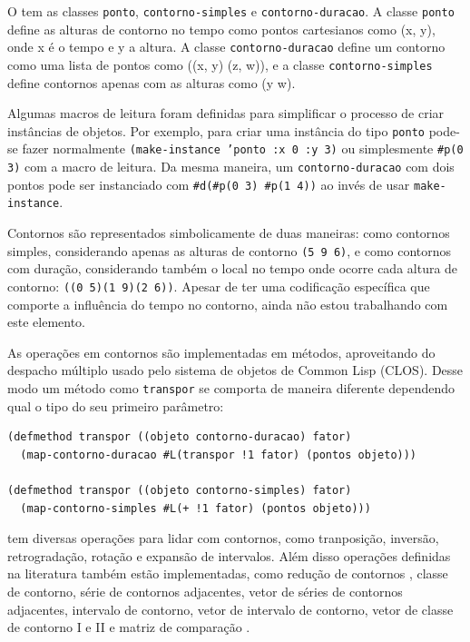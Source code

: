 O \goiaba{} tem as classes \texttt{ponto}, \texttt{contorno-simples} e
\texttt{contorno-duracao}. A classe \texttt{ponto} define as alturas
de contorno no tempo como pontos cartesianos como (x, y), onde x é o
tempo e y a altura. A classe \texttt{contorno-duracao} define um
contorno como uma lista de pontos como ((x, y) (z, w)), e a classe
\texttt{contorno-simples} define contornos apenas com as alturas como
(y w).

Algumas macros de leitura foram definidas para simplificar o processo
de criar instâncias de objetos. Por exemplo, para criar uma instância
do tipo \texttt{ponto} pode-se fazer normalmente
\texttt{(make-instance 'ponto :x 0 :y 3)} ou simplesmente
\verb!#p(0 3)! com a macro de leitura. Da mesma maneira, um
\texttt{contorno-duracao} com dois pontos pode ser instanciado com
\verb!#d(#p(0 3) #p(1 4))! ao invés de usar \texttt{make-instance}.

Contornos são representados simbolicamente de duas maneiras: como
contornos simples, considerando apenas as alturas de contorno
\verb!(5 9 6)!, e como contornos com duração, considerando também o
local no tempo onde ocorre cada altura de contorno:
\verb!((0 5)(1 9)(2 6))!. Apesar de ter uma codificação específica que
comporte a influência do tempo no contorno, ainda não estou
trabalhando com este elemento.

As operações em contornos são implementadas em métodos, aproveitando
do despacho múltiplo usado pelo sistema de objetos de Common Lisp
(CLOS). Desse modo um método como \texttt{transpor} se comporta de
maneira diferente dependendo qual o tipo do seu primeiro parâmetro:

\begin{verbatim}
(defmethod transpor ((objeto contorno-duracao) fator)
  (map-contorno-duracao #L(transpor !1 fator) (pontos objeto)))

(defmethod transpor ((objeto contorno-simples) fator)
  (map-contorno-simples #L(+ !1 fator) (pontos objeto)))
\end{verbatim}

\goiaba{} tem diversas operações para lidar com contornos, como
tranposição, inversão, retrogradação, rotação e expansão de
intervalos. Além disso operações definidas na literatura também estão
implementadas, como redução de contornos \cite{adams76:melodic},
classe de contorno, série de contornos adjacentes, vetor de séries de
contornos adjacentes, intervalo de contorno, vetor de intervalo de
contorno, vetor de classe de contorno I e II
\cite{friedmann85:methodology} e matriz de comparação
\cite{morris93:directions}.

